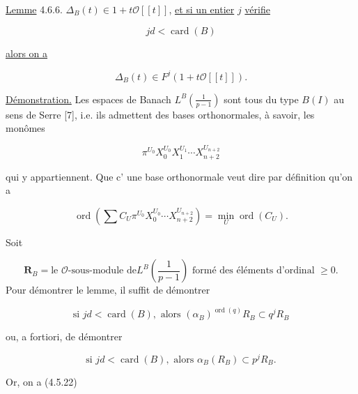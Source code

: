 \underline{Lemme} 4.6.6.
$\Delta_B(t)\in1+t\mathcal O[[t]]$, \underline{et si un entier} $j$ \underline{vérifie}

\begin{equation}\tag{4.6.7}
jd<\operatorname{card}(B)
\end{equation}

\underline{alors on a}

\begin{equation}\tag{4.6.8}
\Delta_B(t)\in F^j(1+t\mathcal O[[t]]).
\end{equation}


\underline{Démonstration.}
Les espaces de Banach
$L^B\!\left(\frac1{p-1}\right)$ sont tous \og du type $B(I)$\fg{} au sens de
Serre [7], i.e. ils admettent des \og bases orthonormales\fg{}, à savoir, les
monômes

\begin{equation}\tag{4.6.9}
\pi^{U_0}X_0^{U_0}X_1^{U_1}\cdots X_{n+2}^{U_{n+2}}
\end{equation}

\noindent
qui y appartiennent. Que c' une base \og orthonormale\fg{} veut dire par
définition qu'on a

\begin{equation}\tag{4.6.10}
\operatorname{ord}\!\left(
\sum C_U\pi^{U_0}X_0^{U_0}\cdots X_{n+2}^{U_{n+2}}
\right)
=\min_U\operatorname{ord}(C_U).
\end{equation}

Soit

\begin{equation}\tag{4.6.11}
\mathbf R_B=\text{le $\mathcal O$-sous-module de
$L^B\!\left(\frac1{p-1}\right)$ formé des éléments d'ordinal $\geq0$}.
\end{equation}
Pour démontrer le lemme, il suffit de démontrer

\begin{equation}\tag{4.6.12}
\text{si }jd<\operatorname{card}(B),\text{ alors }
(\alpha_B)^{\operatorname{ord}(q)}R_B\subset q^jR_B
\end{equation}

ou, a fortiori, de démontrer

\begin{equation}\tag{4.6.13}
\text{si }jd<\operatorname{card}(B),\text{ alors }
\alpha_B(R_B)\subset p^jR_B.
\end{equation}

Or, on a (4.5.22)

